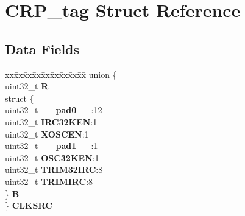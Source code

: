 \hypertarget{structCRP__tag}{}\section{C\+R\+P\+\_\+tag Struct Reference}
\label{structCRP__tag}
\subsection*{Data Fields}
\begin{DoxyCompactItemize}
\item 
\mbox{\label{structCRP__tag_a72a447a1dae65e825a2dfd607bfe7f67}} 
\begin{tabbing}
xx\=xx\=xx\=xx\=xx\=xx\=xx\=xx\=xx\=\kill
union \{\\
\>uint32\_t {\bfseries R}\\
\>struct \{\\
\>\>uint32\_t {\bfseries \_\_pad0\_\_}:12\\
\>\>uint32\_t {\bfseries IRC32KEN}:1\\
\>\>uint32\_t {\bfseries XOSCEN}:1\\
\>\>uint32\_t {\bfseries \_\_pad1\_\_}:1\\
\>\>uint32\_t {\bfseries OSC32KEN}:1\\
\>\>uint32\_t {\bfseries TRIM32IRC}:8\\
\>\>uint32\_t {\bfseries TRIMIRC}:8\\
\>\} {\bfseries B}\\
\} {\bfseries CLKSRC}\\


\end{tabbing}
\end{DoxyCompactItemize}
